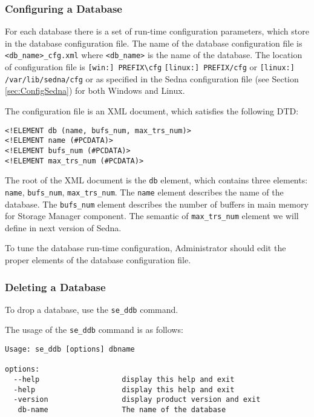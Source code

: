 \documentclass[a4paper,12pt]{article}
\begin{document}
\subsubsection{Configuring a Database}
\label{ConfigDB}
For each database there is a set of run-time configuration parameters, which store in the database configuration file. The name of the database configuration file is \verb!<db_name>_cfg.xml! where \verb!<db_name>! is the name of the database. The location of configuration file is \verb![win:] PREFIX\cfg! \verb![linux:] PREFIX/cfg! or \verb![linux:] /var/lib/sedna/cfg! or as specified in the Sedna configuration file (see Section \ref{sec:ConfigSedna}) for both Windows and Linux. 

The configuration file is an XML document, which satisfies the following DTD: 

\begin{verbatim}
<!ELEMENT db (name, bufs_num, max_trs_num)>
<!ELEMENT name (#PCDATA)>
<!ELEMENT bufs_num (#PCDATA)>
<!ELEMENT max_trs_num (#PCDATA)>
\end{verbatim}

The root of the XML document is the \verb!db! element, which contains three elements: \verb!name!, \verb!bufs_num!, \verb!max_trs_num!. The \verb!name! element describes the name of the database. The \verb!bufs_num! element describes the number of buffers in main memory for Storage Manager component. The semantic of \verb!max_trs_num! element we will define in next version of Sedna.

To tune the database run-time configuration, Administrator should edit the proper elements of the database configuration file.

\subsubsection{Deleting a Database}

To drop a database, use the \verb!se_ddb! command.

The usage of the \verb!se_ddb! command is as follows:

\begin{verbatim}
Usage: se_ddb [options] dbname

options:
  --help                   display this help and exit
  -help                    display this help and exit
  -version                 display product version and exit
   db-name                 The name of the database
\end{verbatim}
\end{document}
